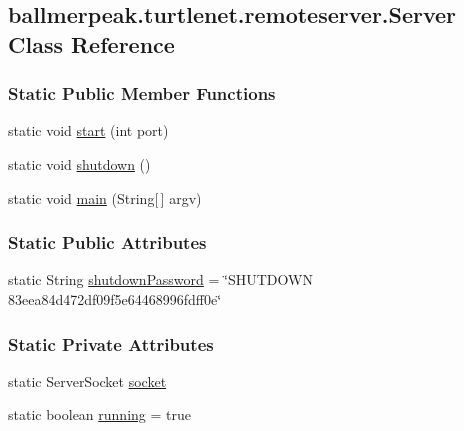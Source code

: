 \hypertarget{classballmerpeak_1_1turtlenet_1_1remoteserver_1_1Server}{\subsection{ballmerpeak.\-turtlenet.\-remoteserver.\-Server Class Reference}
\label{classballmerpeak_1_1turtlenet_1_1remoteserver_1_1Server}
}
\subsubsection*{Static Public Member Functions}
\begin{DoxyCompactItemize}
\item 
static void \hyperlink{classballmerpeak_1_1turtlenet_1_1remoteserver_1_1Server_a48f2ebb138b28914f6351e81f84fa02c}{start} (int port)
\item 
static void \hyperlink{classballmerpeak_1_1turtlenet_1_1remoteserver_1_1Server_a884654078b48154feac526fd94a9efe9}{shutdown} ()
\item 
static void \hyperlink{classballmerpeak_1_1turtlenet_1_1remoteserver_1_1Server_a01aebeba4dcef19b48fda4be14b3f433}{main} (String\mbox{[}$\,$\mbox{]} argv)
\end{DoxyCompactItemize}
\subsubsection*{Static Public Attributes}
\begin{DoxyCompactItemize}
\item 
static String \hyperlink{classballmerpeak_1_1turtlenet_1_1remoteserver_1_1Server_a1e2e63723daf1b2544af8d00be7ba4f0}{shutdown\-Password} = \char`\"{}S\-H\-U\-T\-D\-O\-W\-N 83eea84d472df09f5e64468996fdff0e\char`\"{}
\end{DoxyCompactItemize}
\subsubsection*{Static Private Attributes}
\begin{DoxyCompactItemize}
\item 
static Server\-Socket \hyperlink{classballmerpeak_1_1turtlenet_1_1remoteserver_1_1Server_a7c8eb04639b16695b20c36b55d3e1773}{socket}
\item 
static boolean \hyperlink{classballmerpeak_1_1turtlenet_1_1remoteserver_1_1Server_abbb43613df0ad76d3bca12b361dc118f}{running} = true
\end{DoxyCompactItemize}


